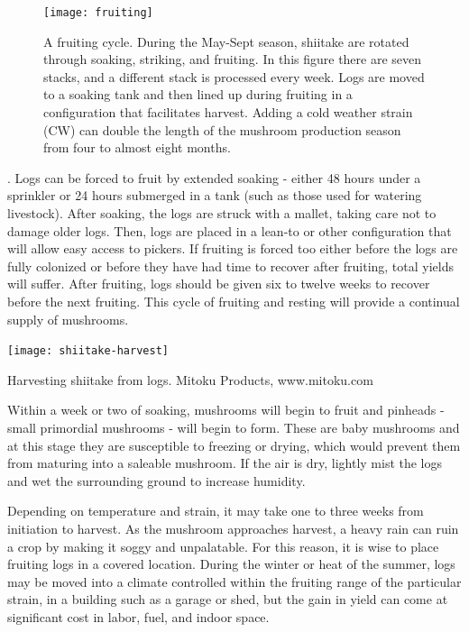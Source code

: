 \documentclass{tufte-handout}
\begin{document}
\begin{figure}
\texttt{[image: fruiting]}
\caption{A fruiting cycle. During the May-Sept season, shiitake are rotated through soaking, striking, and fruiting. 
In this figure there are seven stacks, and a different stack is processed every week. Logs are moved to a soaking tank and then lined up during fruiting in a configuration that facilitates harvest.
Adding a cold weather strain (CW) can double the length of the mushroom production season from four to almost eight months.}
\end{figure}

. 
Logs can be forced to fruit by extended soaking - either 48 hours under a sprinkler or 24 hours submerged in a tank (such as those used for watering livestock). 
After soaking, the logs are struck with a mallet,  taking care not to damage older logs. 
Then, logs are placed in a lean-to or other configuration that will allow easy access to pickers.
If fruiting is forced too either before the logs are fully colonized or before they have had time to recover after fruiting, total yields will suffer. 
After fruiting, logs should be given six to twelve weeks to recover before the next fruiting. 
This cycle of fruiting and resting will provide a continual supply of mushrooms.

\begin{marginfigure}
\texttt{[image: shiitake-harvest]}
\caption{Harvesting shiitake from logs. Mitoku Products, www.mitoku.com}
\end{marginfigure}

Within a week or two of soaking, mushrooms will begin to fruit and pinheads - small primordial mushrooms - will begin to form. These are baby mushrooms and at this stage they are susceptible to freezing or drying, which would prevent them from maturing into a saleable mushroom. 
If the air is dry, lightly mist the logs and wet the surrounding ground to increase humidity.

Depending on temperature and strain, it may take one to three weeks from initiation to harvest. 
As the mushroom approaches harvest, a heavy rain can ruin a crop by making it soggy and unpalatable. 
For this reason, it is wise to place fruiting logs in a covered location. 
During the winter or heat of the summer, logs may be moved into a climate controlled within the fruiting range of the particular strain, in a building such as a garage or shed, but the gain in yield can come at significant cost in labor, fuel, and indoor space.
\end{document}
